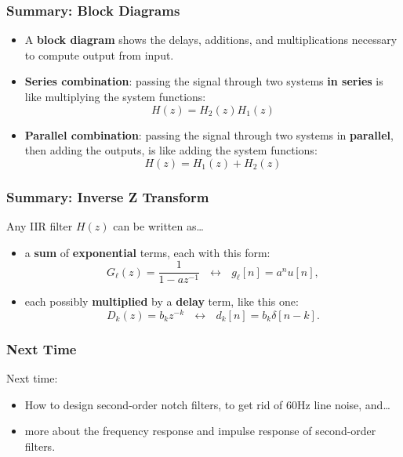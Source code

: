 \documentclass{beamer}
\begin{document}
\begin{frame}
  \frametitle{Summary: Block Diagrams}
  \begin{itemize}
  \item A {\bf block diagram} shows the delays, additions, and
    multiplications necessary to compute output from input.
  \item {\bf Series combination}: passing the signal through two
    systems {\bf in series} is like multiplying the system functions:
    \[
    H(z)=H_2(z)H_1(z)
    \]
  \item {\bf Parallel combination}: passing the signal through two
    systems in {\bf parallel}, then adding the outputs, is like adding
    the system functions:
    \[
    H(z) = H_1(z)+H_2(z)
    \]
  \end{itemize}
\end{frame}
  
\begin{frame}
  \frametitle{Summary: Inverse Z Transform}

  Any IIR filter $H(z)$ can be written as\ldots
  \begin{itemize}
  \item a {\bf sum} of {\bf exponential} terms, each with this form:
    \begin{displaymath}
      G_\ell(z)=\frac{1}{1-az^{-1}}~~~\leftrightarrow~~~g_\ell[n]= a^nu[n],
    \end{displaymath}
  \item each possibly {\bf multiplied} by a {\bf delay} term, like this one:
    \begin{displaymath}
      D_k(z)=b_kz^{-k}~~~\leftrightarrow~~~d_k[n]=b_k\delta[n-k].
    \end{displaymath}
  \end{itemize}
\end{frame}

\begin{frame}
  \frametitle{Next Time}

  Next time:
  \begin{itemize}
  \item How to  design second-order notch filters, to get rid of 60Hz line noise, and\ldots
  \item more about the frequency response and impulse response of second-order filters.
  \end{itemize}
\end{frame}
\end{document}
